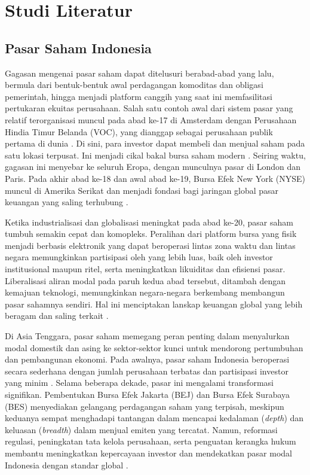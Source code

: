 \chapter{Studi Literatur}


\section{Pasar Saham Indonesia}
Gagasan mengenai pasar saham dapat ditelusuri berabad-abad yang lalu, bermula dari bentuk-bentuk awal perdagangan komoditas dan obligasi pemerintah, hingga menjadi platform canggih yang saat ini memfasilitasi pertukaran ekuitas perusahaan. Salah satu contoh awal dari sistem pasar yang relatif terorganisasi muncul pada abad ke-17 di Amsterdam dengan Perusahaan Hindia Timur Belanda (VOC), yang dianggap sebagai perusahaan publik pertama di dunia \parencite{Petram2014,Neal1990}. Di sini, para investor dapat membeli dan menjual saham pada satu lokasi terpusat. Ini menjadi cikal bakal bursa saham modern  \parencite{Goetzmann2016}. Seiring waktu, gagasan ini menyebar ke seluruh Eropa, dengan munculnya pasar di London dan Paris. Pada akhir abad ke-18 dan awal abad ke-19, Bursa Efek New York (NYSE) muncul di Amerika Serikat dan menjadi fondasi bagi jaringan global pasar keuangan yang saling terhubung \parencite{Markham2002,Goetzmann2016}.

Ketika industrialisasi dan globalisasi meningkat pada abad ke-20, pasar saham tumbuh semakin cepat dan komopleks. Peralihan dari platform bursa yang fisik menjadi berbasis elektronik yang dapat beroperasi lintas zona waktu dan lintas negara memungkinkan partisipasi oleh yang lebih luas, baik oleh investor institusional maupun ritel, serta meningkatkan likuiditas dan efisiensi pasar. Liberalisasi aliran modal pada paruh kedua abad tersebut, ditambah dengan kemajuan teknologi, memungkinkan negara-negara berkembang membangun pasar sahamnya sendiri. Hal ini menciptakan lanskap keuangan global yang lebih beragam dan saling terkait \parencite{OECD2018}.

Di Asia Tenggara, pasar saham memegang peran penting dalam menyalurkan modal domestik dan asing ke sektor-sektor kunci untuk mendorong pertumbuhan dan pembangunan ekonomi. Pada awalnya, pasar saham Indonesia beroperasi secara sederhana dengan jumlah perusahaan terbatas dan partisipasi investor yang minim \parencite{OJK2007}. Selama beberapa dekade, pasar ini mengalami transformasi signifikan. Pembentukan Bursa Efek Jakarta (BEJ) dan Bursa Efek Surabaya (BES) menyediakan gelangang perdagangan saham yang terpisah, meskipun keduanya sempat menghadapi tantangan dalam mencapai kedalaman (\textit{depth}) dan keluasan (\textit{breadth}) dalam menjual emiten yang tercatat. Namun, reformasi regulasi, peningkatan tata kelola perusahaan, serta penguatan kerangka hukum membantu meningkatkan kepercayaan investor dan mendekatkan pasar modal Indonesia dengan standar global \parencite{OECD2018}.

